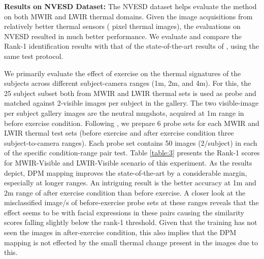 \documentclass[smallextended,natbib]{svjour3}       \usepackage{graphicx}
\begin{document}
\noindent\textbf{Results on NVESD Dataset:} The NVESD dataset helps evaluate the method on both MWIR and LWIR thermal domains. Given the image acquisitions from relatively better thermal sensors ( pixel thermal images), the evaluations on NVESD resulted in much better performance. We evaluate and compare the Rank-1 identification results with that of the state-of-the-art results of \cite{hu2015}, using the same test protocol. 

We primarily evaluate the effect of exercise on the thermal signatures of the subjects across different subject-camera ranges (1m, 2m, and 4m). For this, the 25 subject subset both from MWIR and LWIR thermal sets is used as probe and matched against 2-visible images per subject in the gallery. The two visible-image per subject gallery images are the neutral mugshots, acquired at 1m range in before exercise condition. 
Following \cite{hu2015}, we prepare 6 probe sets for each MWIR and LWIR thermal test sets (before exercise and after exercise condition  three subject-to-camera ranges). Each probe set contains 50 images (2/subject) in each of the specific condition-range pair test. Table \ref{table:3} presents the Rank-1 scores for MWIR-Visible and LWIR-Visible scenario of this experiment. As the results depict, DPM mapping improves the state-of-the-art by a considerable margin, especially at longer ranges. An intriguing result is the better accuracy at 1m and 2m range of after exercise condition than before exercise. A closer look at the misclassified image/s of before-exercise probe sets at these ranges reveals that the effect seems to be with facial expressions in these pairs causing the similarity scores falling slightly below the rank-1 threshold. Given that the training has not seen the images in after-exercise condition, this also implies that the DPM mapping is not effected by the small thermal change present in the images due to this.
\end{document}
